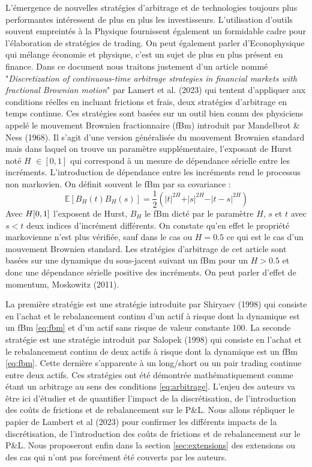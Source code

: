 \documentclass[12pt,a4paper]{article}
\begin{document}
L'émergence de nouvelles stratégies d'arbitrage et de technologies toujours plus performantes intéressent de plus en plus les investisseurs. L'utilisation d'outils souvent empreintés à la Physique fournissent également un formidable cadre pour l'élaboration de stratégies de trading. On peut également parler d'Econophysique qui mélange économie et physique, c'est un sujet de plus en plus présent en finance. 
Dans ce document nous traitons justement d'un article nommé "\textit{Discretization of continuous-time arbitrage strategies in financial markets with fractional
Brownian motion}" par Lamert et al. (2023)\cite{lamert2023discretization} qui tentent d'appliquer aux conditions réelles en incluant frictions et frais, deux stratégies d'arbitrage en temps continue. Ces stratégies sont basées sur un outil bien connu des physiciens appelé le mouvement Brownien fractionnaire (fBm) introduit par Mandelbrot \& Ness (1968)\cite{MandelbrotNess1968}. Il s'agit d'une version généralisée du mouvement Brownien standard mais dans laquel on trouve un paramètre supplémentaire, l'exposant de Hurst noté $H$ $\in [0,1]$ qui correspond à un mesure de dépendance sérielle entre les incréments. L'introduction de dépendance entre les incréments rend le processus non markovien. On définit souvent le fBm par sa covariance :
\begin{equation}\label{eq:fbm}
    \mathbb{E}[B_H(t)B_H(s)]=\frac{1}{2}(\vert t\vert^{2H}+\vert s\vert^{2H}-\vert t-s\vert^{2H})
\end{equation}
Avec $H\space [0,1]$ l'exposent de Hurst, $B_H$ le fBm dicté par le paramètre $H$, $s$ et $t$ avec $s<t$ deux indices d'incrément différents. On constate qu'en effet le propriété markovienne n'est plus vérifiée, sauf dans le cas ou $H=0.5$ ce qui est le cas d'un mouvement Brownien standard. Les stratégies d'arbitrage de cet article sont basées sur une dynamique du sous-jacent suivant un fBm pour un $H>0.5$ et donc une dépendance sérielle positive des incréments. On peut parler d'effet de momentum, Moskowitz (2011)\cite{moskowitz2011}.

La première stratégie est une stratégie introduite par Shiryaev (1998)\cite{shiryaev1998} qui consiste en l'achat et le rebalancement continu d'un actif à risque dont la dynamique est un fBm \ref{eq:fbm} et d'un actif sans risque de valeur constante 100. La seconde stratégie est une stratégie introduit par Salopek (1998)\cite{salopek1998} qui consiste en l'achat et le rebalancement continu de deux actifs à risque dont la dynamique est un fBm \ref{eq:fbm}. Cette dernière s'apparente à un long/short ou un pair trading continue entre deux actifs. Ces stratégies ont été démontrée mathématiquement comme étant un arbitrage au sens des conditions \ref{eq:arbitrage}. L'enjeu des auteurs va être ici d'étudier et de quantifier l'impact de la discrétisation, de l'introduction des coûts de frictions et de rebalancement sur le P\&L. Nous allons répliquer le papier de Lambert et al (2023)\cite{lamert2023discretization} pour confirmer les différents impacts de la discrétisation, de l'introduction des coûts de frictions et de rebalancement sur le P\&L. Nous proposeront enfin dans la section \ref{sec:extensions} des extensions ou des cas qui n'ont pas forcément été couverts par les auteurs.
\end{document}
